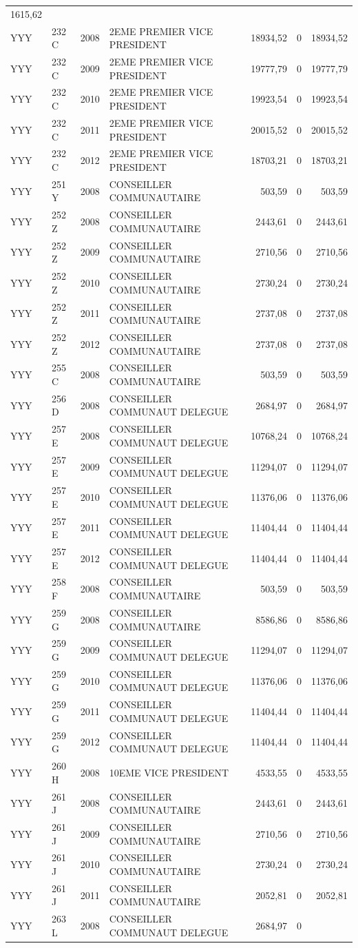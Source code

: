 \begin{longtable}[]{@{}llrlrrr@{}}
1615,62\tabularnewline
YYY & 232 C & 2008 & 2EME PREMIER VICE PRESIDENT & 18934,52 & 0 &
18934,52\tabularnewline
YYY & 232 C & 2009 & 2EME PREMIER VICE PRESIDENT & 19777,79 & 0 &
19777,79\tabularnewline
YYY & 232 C & 2010 & 2EME PREMIER VICE PRESIDENT & 19923,54 & 0 &
19923,54\tabularnewline
YYY & 232 C & 2011 & 2EME PREMIER VICE PRESIDENT & 20015,52 & 0 &
20015,52\tabularnewline
YYY & 232 C & 2012 & 2EME PREMIER VICE PRESIDENT & 18703,21 & 0 &
18703,21\tabularnewline
YYY & 251 Y & 2008 & CONSEILLER COMMUNAUTAIRE & 503,59 & 0 &
503,59\tabularnewline
YYY & 252 Z & 2008 & CONSEILLER COMMUNAUTAIRE & 2443,61 & 0 &
2443,61\tabularnewline
YYY & 252 Z & 2009 & CONSEILLER COMMUNAUTAIRE & 2710,56 & 0 &
2710,56\tabularnewline
YYY & 252 Z & 2010 & CONSEILLER COMMUNAUTAIRE & 2730,24 & 0 &
2730,24\tabularnewline
YYY & 252 Z & 2011 & CONSEILLER COMMUNAUTAIRE & 2737,08 & 0 &
2737,08\tabularnewline
YYY & 252 Z & 2012 & CONSEILLER COMMUNAUTAIRE & 2737,08 & 0 &
2737,08\tabularnewline
YYY & 255 C & 2008 & CONSEILLER COMMUNAUTAIRE & 503,59 & 0 &
503,59\tabularnewline
YYY & 256 D & 2008 & CONSEILLER COMMUNAUT DELEGUE & 2684,97 & 0 &
2684,97\tabularnewline
YYY & 257 E & 2008 & CONSEILLER COMMUNAUT DELEGUE & 10768,24 & 0 &
10768,24\tabularnewline
YYY & 257 E & 2009 & CONSEILLER COMMUNAUT DELEGUE & 11294,07 & 0 &
11294,07\tabularnewline
YYY & 257 E & 2010 & CONSEILLER COMMUNAUT DELEGUE & 11376,06 & 0 &
11376,06\tabularnewline
YYY & 257 E & 2011 & CONSEILLER COMMUNAUT DELEGUE & 11404,44 & 0 &
11404,44\tabularnewline
YYY & 257 E & 2012 & CONSEILLER COMMUNAUT DELEGUE & 11404,44 & 0 &
11404,44\tabularnewline
YYY & 258 F & 2008 & CONSEILLER COMMUNAUTAIRE & 503,59 & 0 &
503,59\tabularnewline
YYY & 259 G & 2008 & CONSEILLER COMMUNAUTAIRE & 8586,86 & 0 &
8586,86\tabularnewline
YYY & 259 G & 2009 & CONSEILLER COMMUNAUT DELEGUE & 11294,07 & 0 &
11294,07\tabularnewline
YYY & 259 G & 2010 & CONSEILLER COMMUNAUT DELEGUE & 11376,06 & 0 &
11376,06\tabularnewline
YYY & 259 G & 2011 & CONSEILLER COMMUNAUT DELEGUE & 11404,44 & 0 &
11404,44\tabularnewline
YYY & 259 G & 2012 & CONSEILLER COMMUNAUT DELEGUE & 11404,44 & 0 &
11404,44\tabularnewline
YYY & 260 H & 2008 & 10EME VICE PRESIDENT & 4533,55 & 0 &
4533,55\tabularnewline
YYY & 261 J & 2008 & CONSEILLER COMMUNAUTAIRE & 2443,61 & 0 &
2443,61\tabularnewline
YYY & 261 J & 2009 & CONSEILLER COMMUNAUTAIRE & 2710,56 & 0 &
2710,56\tabularnewline
YYY & 261 J & 2010 & CONSEILLER COMMUNAUTAIRE & 2730,24 & 0 &
2730,24\tabularnewline
YYY & 261 J & 2011 & CONSEILLER COMMUNAUTAIRE & 2052,81 & 0 &
2052,81\tabularnewline
YYY & 263 L & 2008 & CONSEILLER COMMUNAUT DELEGUE & 2684,97 & 0 &

\end{longtable}
